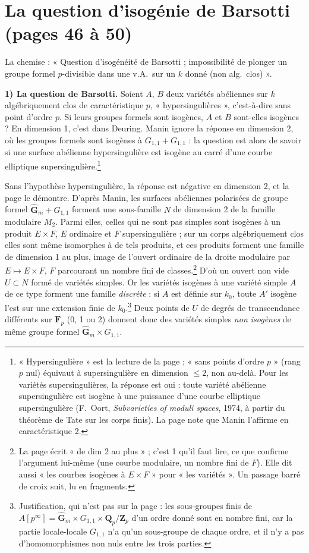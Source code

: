 \documentclass[11pt,a4paper]{article}
\begin{document}
\section*{La question d'isogénie de Barsotti (pages 46 à 50)}

La chemise : « Question d'isogénéité de Barsotti ; impossibilité de plonger un
groupe formel $p$-divisible dans une v.A.\ sur un $k$ donné (non alg.\ clos) ».

\textbf{1) La question de Barsotti.} Soient $A$, $B$ deux variétés abéliennes
sur $k$ algébriquement clos de caractéristique $p$, « hypersingulières »,
c'est-à-dire sans point d'ordre $p$. Si leurs groupes formels sont isogènes,
$A$ et $B$ sont-elles isogènes ? En dimension 1, c'est dans Deuring. Manin ignore
la réponse en dimension 2, où les groupes formels sont isogènes à
$G_{1,1} + G_{1,1}$ : la question est alors de savoir si une surface abélienne
hypersingulière est isogène au carré d'une courbe elliptique
supersingulière.\footnote{« Hypersingulière » est la lecture de la page ;
« sans points d'ordre $p$ » (rang $p$ nul) équivaut à supersingulière en
dimension $\leq 2$, non au-delà. Pour les variétés supersingulières, la
réponse est oui : toute variété abélienne supersingulière est isogène à une
puissance d'une courbe elliptique supersingulière (F.~Oort, \emph{Subvarieties
of moduli spaces}, 1974, à partir du théorème de Tate sur les corps finis).
La page note que Manin l'affirme en caractéristique 2.}

Sans l'hypothèse hypersingulière, la réponse est négative en dimension 2, et la
page le démontre. D'après Manin, les surfaces abéliennes polarisées de groupe
formel $\widehat{\mathbf{G}}_m + G_{1,1}$ forment une sous-famille $N$ de
dimension 2 de la famille modulaire $M_2$. Parmi elles, celles qui ne sont pas
simples sont isogènes à un produit $E \times F$, $E$ ordinaire et $F$
supersingulière ; sur un corps algébriquement clos elles sont même
isomorphes à de tels produits, et ces produits forment une famille de dimension
1 au plus, image de l'ouvert ordinaire de la droite modulaire par
$E \mapsto E \times F$, $F$ parcourant un nombre fini de classes.\footnote{La
page écrit « de dim 2 au plus » ; c'est 1 qu'il faut lire, ce que confirme
l'argument lui-même (une courbe modulaire, un nombre fini de $F$). Elle dit
aussi « les courbes isogènes à $E\times F$ » pour « les variétés ». Un
passage barré de croix suit, lu en fragments.} D'où un ouvert non vide
$U \subset N$ formé de variétés simples. Or les variétés isogènes à une
variété simple $A$ de ce type forment une famille \emph{discrète} : si $A$ est
définie sur $k_0$, toute $A'$ isogène l'est sur une extension finie de
$k_0$.\footnote{Justification, qui n'est pas sur la page : les sous-groupes
finis de $A[p^\infty] = \widehat{\mathbf{G}}_m \times G_{1,1} \times
\mathbf{Q}_p/\mathbf{Z}_p$ d'un ordre donné sont en nombre fini, car la partie
locale-locale $G_{1,1}$ n'a qu'un sous-groupe de chaque ordre, et il n'y a pas
d'homomorphismes non nuls entre les trois parties.} Deux points de $U$ de degrés
de transcendance différents sur $\mathbf{F}_p$ (0, 1 ou 2) donnent donc des
variétés simples \emph{non isogènes} de même groupe formel
$\widehat{\mathbf{G}}_m \times G_{1,1}$.
\end{document}
